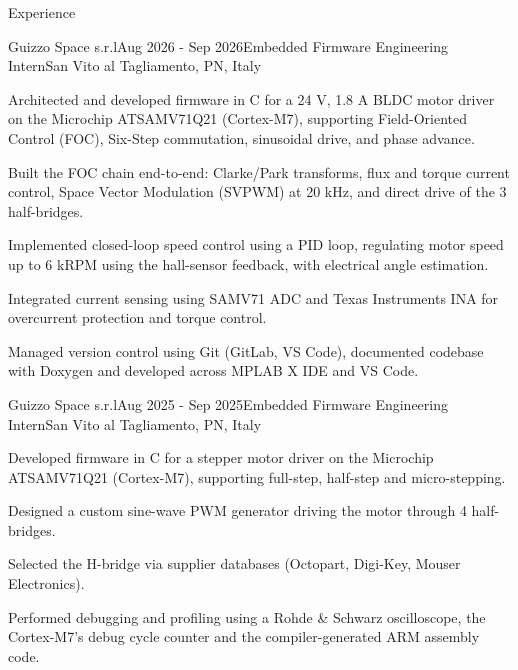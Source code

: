 \documentclass[
	11pt, %
]{resume} %
\begin{document}



\begin{rSection}{Experience}

	\begin{rSubsection}{Guizzo Space s.r.l}{Aug 2026 - Sep 2026}{Embedded Firmware Engineering Intern}{San Vito al Tagliamento, PN, Italy}
		\item Architected and developed firmware in C for a 24 V, 1.8 A BLDC motor driver on the Microchip ATSAMV71Q21 (Cortex-M7), supporting Field-Oriented Control (FOC), Six-Step commutation, sinusoidal drive, and phase advance.
		\item Built the FOC chain end-to-end: Clarke/Park transforms, flux and torque current control, Space Vector Modulation (SVPWM) at 20 kHz, and direct drive of the 3 half-bridges.
		\item Implemented closed-loop speed control using a PID loop, regulating motor speed up to 6 kRPM using the hall-sensor feedback, with electrical angle estimation.
		\item Integrated current sensing using SAMV71 ADC and Texas Instruments INA for overcurrent protection and torque control.
		\item Managed version control using Git (GitLab, VS Code), documented codebase with Doxygen and developed across MPLAB X IDE and VS Code.
	\end{rSubsection}

	\begin{rSubsection}{Guizzo Space s.r.l}{Aug 2025 - Sep 2025}{Embedded Firmware Engineering Intern}{San Vito al Tagliamento, PN, Italy}
		\item Developed firmware in C for a stepper motor driver on the Microchip ATSAMV71Q21 (Cortex-M7), supporting full-step, half-step and micro-stepping.
		\item Designed a custom sine-wave PWM generator driving the motor through 4 half-bridges.
		\item Selected the H-bridge via supplier databases (Octopart, Digi-Key, Mouser Electronics).
		\item Performed debugging and profiling using a Rohde \& Schwarz oscilloscope, the Cortex-M7's debug cycle counter and the compiler-generated ARM assembly code.
	\end{rSubsection}

\end{rSection}
\end{document}
